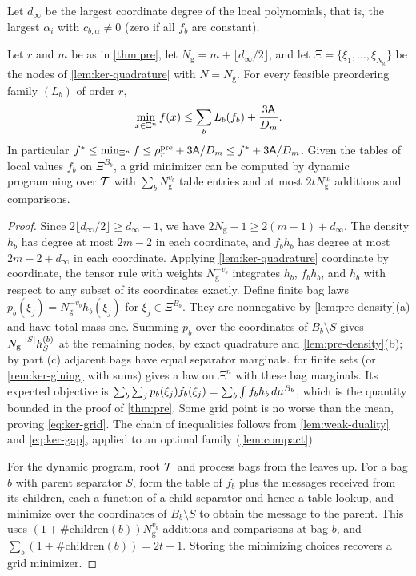 Let $d_\infty$ be the largest coordinate degree of the local polynomials,
that is, the largest $\alpha_i$ with $c_{b,\alpha}\ne0$ (zero if all $f_b$
are constant).

\begin{corollary}\label{cor:pre-grid}
Let $r$ and $m$ be as in \cref{thm:pre}, let $N_{\mathrm g}=m+\lfloor
d_\infty/2\rfloor$, and let $\Xi=\{\xi_1,\dots,\xi_{N_{\mathrm g}}\}$ be the
nodes of \cref{lem:ker-quadrature} with $N=N_{\mathrm g}$. For every
feasible preordering family $(L_b)$ of order $r$,
\begin{equation}\label{eq:ker-grid}
  \min_{x\in\Xi^n}f(x)\le\sum_bL_b(f_b)+\frac{3\mathsf{A}}{D_m}.
\end{equation}
In particular $f^{*}\le\min_{\Xi^n}f\le\rho^{\mathrm{pre}}_r+3\mathsf{A}/D_m\le
f^{*}+3\mathsf{A}/D_m$. Given the tables of local values $f_b$ on
$\Xi^{B_b}$, a grid minimizer can be computed by dynamic programming over
$\mathcal{T}$ with $\sum_bN_{\mathrm g}^{v_b}$ table entries and at most
$2tN_{\mathrm g}^w$ additions and comparisons.
\end{corollary}

\begin{proof}
Since $2\lfloor d_\infty/2\rfloor\ge d_\infty-1$, we have
$2N_{\mathrm g}-1\ge2(m-1)+d_\infty$. The density $h_b$ has degree at most
$2m-2$ in each coordinate, and $f_bh_b$ has degree at most $2m-2+d_\infty$
in each coordinate. Applying \cref{lem:ker-quadrature} coordinate by
coordinate, the tensor rule with weights $N_{\mathrm g}^{-v_b}$ integrates
$h_b$, $f_bh_b$, and $h_b$ with respect to any subset of its coordinates
exactly. Define finite bag laws
$p_b(\xi_{j})=N_{\mathrm g}^{-v_b}h_b(\xi_j)$ for
$\xi_j\in\Xi^{B_b}$. They are nonnegative by \cref{lem:pre-density}(a) and
have total mass one. Summing $p_b$ over the coordinates of $B_b\setminus S$
gives $N_{\mathrm g}^{-\lvert S\rvert}h^{(b)}_S$ at the remaining nodes, by exact
quadrature and \cref{lem:pre-density}(b); by part (c) adjacent bags have
equal separator marginals.  for finite sets (or
\cref{rem:ker-gluing} with sums) gives a law on $\Xi^n$ with these bag
marginals. Its expected objective is
$\sum_b\sum_jp_b(\xi_j)f_b(\xi_j)=\sum_b\int f_bh_b\,d\mu^{B_b}$, which is
the quantity bounded in the proof of \cref{thm:pre}. Some grid point is no
worse than the mean, proving \eqref{eq:ker-grid}. The chain of inequalities
follows from \cref{lem:weak-duality} and \eqref{eq:ker-gap}, applied to an
optimal family (\cref{lem:compact}).

For the dynamic program, root $\mathcal{T}$ and process bags from the leaves up.
For a bag $b$ with parent separator $S$, form the table of $f_b$ plus the
messages received from its children, each a function of a child separator
and hence a table lookup, and minimize over the coordinates of
$B_b\setminus S$ to obtain the message to the parent. This uses
$(1+\#\mathrm{children}(b))N_{\mathrm g}^{v_b}$ additions and comparisons
at bag $b$, and $\sum_b(1+\#\mathrm{children}(b))=2t-1$. Storing the
minimizing choices recovers a grid minimizer.
\end{proof}

